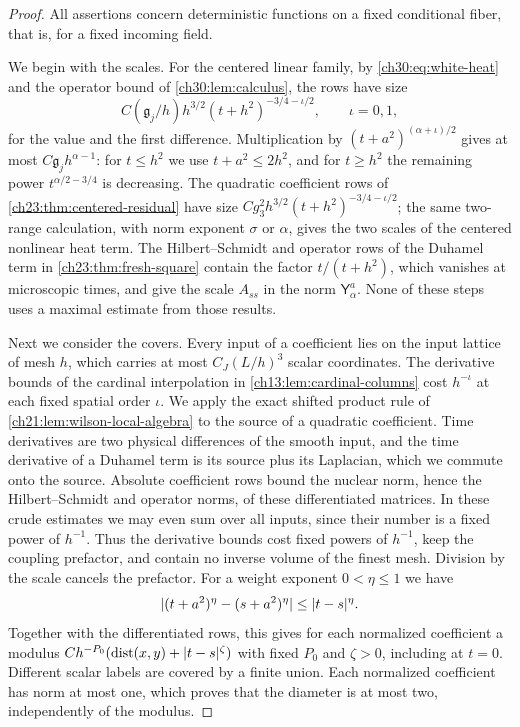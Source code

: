 \begin{proof}
All assertions concern deterministic functions on a fixed conditional fiber, that is, for a fixed incoming field.

We begin with the scales. For the centered linear family, by \eqref{ch30:eq:white-heat} and the operator bound of \cref{ch30:lem:calculus}, the rows have size
\[
 C(\mathfrak g_j/h)h^{3/2}(t+h^2)^{-3/4-\iota/2},\qquad \iota=0,1,
\]
for the value and the first difference. Multiplication by $(t+a^2)^{(\alpha+\iota)/2}$ gives at most $C\mathfrak g_jh^{\alpha-1}$: for $t\le h^2$ we use $t+a^2\le2h^2$, and for $t\ge h^2$ the remaining power $t^{\alpha/2-3/4}$ is decreasing. The quadratic coefficient rows of \cref{ch23:thm:centered-residual} have size $Cg_3^2h^{3/2}(t+h^2)^{-3/4-\iota/2}$; the same two-range calculation, with norm exponent $\sigma$ or $\alpha$, gives the two scales of the centered nonlinear heat term. The Hilbert--Schmidt and operator rows of the Duhamel term in \cref{ch23:thm:fresh-square} contain the factor $t/(t+h^2)$, which vanishes at microscopic times, and give the scale $A_{ss}$ in the norm $\mathsf Y_\alpha^a$. None of these steps uses a maximal estimate from those results.

Next we consider the covers. Every input of a coefficient lies on the input lattice of mesh $h$, which carries at most $C_J(L/h)^3$ scalar coordinates. The derivative bounds of the cardinal interpolation in \cref{ch13:lem:cardinal-columns} cost $h^{-\iota}$ at each fixed spatial order $\iota$. We apply the exact shifted product rule of \cref{ch21:lem:wilson-local-algebra} to the source of a quadratic coefficient. Time derivatives are two physical differences of the smooth input, and the time derivative of a Duhamel term is its source plus its Laplacian, which we commute onto the source. Absolute coefficient rows bound the nuclear norm, hence the Hilbert--Schmidt and operator norms, of these differentiated matrices. In these crude estimates we may even sum over all inputs, since their number is a fixed power of $h^{-1}$. Thus the derivative bounds cost fixed powers of $h^{-1}$, keep the coupling prefactor, and contain no inverse volume of the finest mesh. Division by the scale cancels the prefactor. For a weight exponent $0<\eta\le1$ we have
\[
 \lvert (t+a^2)^\eta-(s+a^2)^\eta\rvert\le\lvert t-s\rvert^\eta .
\]
Together with the differentiated rows, this gives for each normalized coefficient a modulus $Ch^{-P_0}(\operatorname{dist}(x,y)+\lvert t-s\rvert^\zeta)$ with fixed $P_0$ and $\zeta>0$, including at $t=0$. Different scalar labels are covered by a finite union. Each normalized coefficient has norm at most one, which proves that the diameter is at most two, independently of the modulus.


\end{proof}
